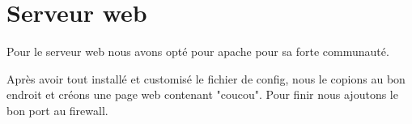 \section{Serveur web}
Pour le serveur web nous avons opté pour apache pour sa forte communauté.



Après avoir tout installé et customisé le fichier de config, nous le copions au bon endroit et créons une page web contenant "coucou". Pour finir nous ajoutons le bon port au firewall.


